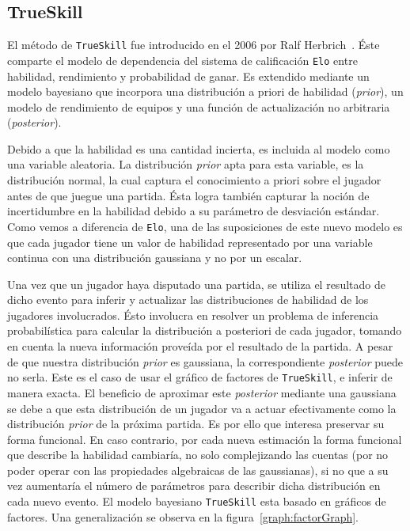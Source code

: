 \documentclass[11pt,twoside,spanish]{report} %
\begin{document}

\subsection{TrueSkill}

El m\'etodo de  \texttt{TrueSkill}  fue introducido en el 2006 por Ralf Herbrich~\cite{Herbrich2007}.
\'Este comparte el modelo de dependencia del sistema de calificaci\'on \texttt{Elo} entre habilidad, rendimiento y probabilidad de ganar.
Es extendido mediante un modelo bayesiano que incorpora una distribuci\'on a priori de habilidad (\textit{prior}), un modelo de rendimiento de equipos y una funci\'on de actualizaci\'on no arbitraria (\textit{posterior}).

Debido a que la habilidad es una cantidad incierta,  es incluida al modelo como una variable aleatoria.
La distribuci\'on  \textit{prior} apta para esta variable, es la distribuci\'on normal, la cual captura el conocimiento a priori sobre el jugador antes de que juegue una partida.
\'Esta logra tambi\'en capturar la noci\'on de incertidumbre en la habilidad debido a su par\'ametro de desviaci\'on est\'andar.
Como vemos a diferencia de \texttt{Elo}, una de las suposiciones de este nuevo modelo es que cada jugador tiene un valor de habilidad representado por una variable continua con una distribuci\'on gaussiana y no por un escalar.

Una vez que un jugador haya disputado una partida, se utiliza el resultado de dicho evento para inferir y actualizar las distribuciones de habilidad de los jugadores involucrados.
\'Esto involucra en resolver un problema de inferencia probabil\'istica para calcular la distribuci\'on a posteriori  de cada jugador,  tomando en cuenta la nueva informaci\'on prove\'ida por el resultado de la partida.
A pesar de que nuestra distribuci\'on \textit{prior} es gaussiana, la correspondiente \textit{posterior} puede no serla.
Este es el caso de usar el gr\'afico de factores de \texttt{TrueSkill}, e inferir de manera exacta.
El beneficio de aproximar este \textit{posterior} mediante una gaussiana se debe a que esta distribuci\'on de un jugador va a actuar efectivamente como la distribuci\'on \textit{prior} de la pr\'oxima partida.
Es por ello que interesa preservar su forma funcional.
En caso contrario, por cada nueva estimaci\'on la forma funcional que describe la habilidad cambiar\'ia, no solo complejizando las cuentas (por no poder operar con las propiedades algebraicas de las gaussianas), si no que a su vez aumentar\'ia el n\'umero de par\'ametros para describir dicha distribuci\'on en cada nuevo evento.
El modelo bayesiano \texttt{TrueSkill} esta basado en gr\'aficos de factores.
Una generalizaci\'on se observa en la figura~\ref{graph:factorGraph}.
\end{document}
